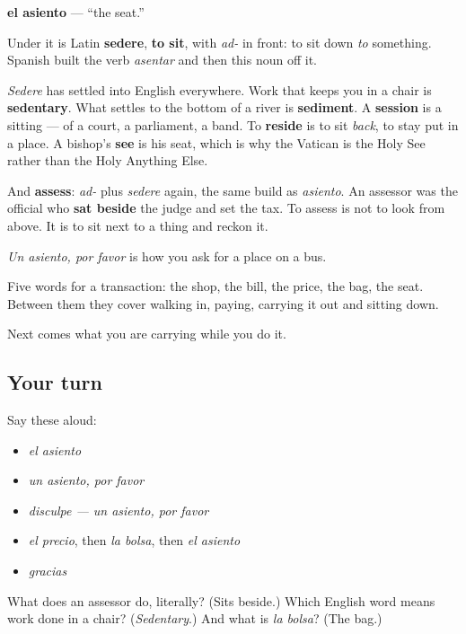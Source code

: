 \begin{cousinweb}
\textbf{el asiento} — \textquotedblleft{}the seat.\textquotedblright{}

Under it is Latin \textbf{sedere}, \textbf{to sit}, with \emph{ad-} in front: to sit down \emph{to} something. Spanish built the verb \emph{asentar} and then this noun off it.

\emph{Sedere} has settled into English everywhere. Work that keeps you in a chair is \textbf{sedentary}. What settles to the bottom of a river is \textbf{sediment}. A \textbf{session} is a sitting — of a court, a parliament, a band. To \textbf{reside} is to sit \emph{back}, to stay put in a place. A bishop's \textbf{see} is his seat, which is why the Vatican is the Holy See rather than the Holy Anything Else.

And \textbf{assess}: \emph{ad-} plus \emph{sedere} again, the same build as \emph{asiento}. An assessor was the official who \textbf{sat beside} the judge and set the tax. To assess is not to look from above. It is to sit next to a thing and reckon it.

\emph{Un asiento, por favor} is how you ask for a place on a bus.
\end{cousinweb}

\begin{grammarlens}[title={What you've built}]
Five words for a transaction: the shop, the bill, the price, the bag, the seat. Between them they cover walking in, paying, carrying it out and sitting down.

Next comes what you are carrying while you do it.
\end{grammarlens}

\subsection*{Your turn}
Say these aloud:

\begin{itemize}
\raggedright
  \item \emph{el asiento}
  \item \emph{un asiento, por favor}
  \item \emph{disculpe — un asiento, por favor}
  \item \emph{el precio}, then \emph{la bolsa}, then \emph{el asiento}
  \item \emph{gracias}
\end{itemize}

\begin{tcolorbox}[breakable,colback=teal!4,colframe=teal!35!black,title={Before you move on}]
What does an assessor do, literally? (Sits beside.) Which English word means work done in a chair? (\emph{Sedentary}.) And what is \emph{la bolsa}? (The bag.)
\end{tcolorbox}
